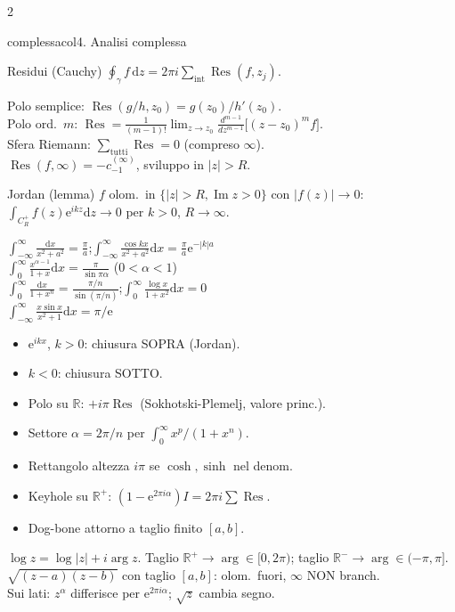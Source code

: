\documentclass[10pt,a4paper]{article}
\newcommand{\R}{\mathbb{R}}
\newcommand{\dd}{\mathrm{d}}
\newcommand{\eu}{\mathrm{e}}
\renewcommand{\Im}{\operatorname{Im}}
\DeclareMathOperator{\Res}{Res}
\begin{document}
\begin{multicols}{2}
\begin{secbox}{complessacol}{4. Analisi complessa}
\begin{teobox}{Residui (Cauchy)}
$\oint_\gamma f\,\dd z=2\pi i\sum_{\text{int}}\Res(f,z_j)$.
\end{teobox}

Polo semplice: $\Res(g/h,z_0)=g(z_0)/h'(z_0)$.\\
Polo ord.\ $m$: $\Res=\frac{1}{(m-1)!}\lim_{z\to z_0}\frac{d^{m-1}}{dz^{m-1}}\bigl[(z-z_0)^mf\bigr]$.\\
Sfera Riemann: $\sum_{\text{tutti}}\Res=0$ (compreso $\infty$).\\
$\Res(f,\infty)=-c_{-1}^{(\infty)}$, sviluppo in $|z|>R$.

\begin{teobox}{Jordan (lemma)}
$f$ olom.\ in $\{|z|>R,\Im z>0\}$ con $|f(z)|\to 0$: $\int_{C_R^+}f(z)\eu^{ikz}\dd z\to 0$ per $k>0$, $R\to\infty$.
\end{teobox}

$\int_{-\infty}^{\infty}\frac{\dd x}{x^2+a^2}=\frac{\pi}{a}$;\quad $\int_{-\infty}^{\infty}\frac{\cos kx}{x^2+a^2}\dd x=\frac{\pi}{a}\eu^{-|k|a}$\\
$\int_0^{\infty}\frac{x^{\alpha-1}}{1+x}\dd x=\frac{\pi}{\sin\pi\alpha}$ ($0\!<\!\alpha\!<\!1$)\\
$\int_0^{\infty}\frac{\dd x}{1+x^n}=\frac{\pi/n}{\sin(\pi/n)}$;\quad $\int_0^{\infty}\frac{\log x}{1+x^2}\dd x=0$\\
$\int_{-\infty}^{\infty}\frac{x\sin x}{x^2+1}\dd x=\pi/\eu$

\begin{itemize}
\item $\eu^{ikx}$, $k>0$: chiusura SOPRA (Jordan).
\item $k<0$: chiusura SOTTO.
\item Polo su $\R$: $+i\pi\Res$ (Sokhotski-Plemelj, valore princ.).
\item Settore $\alpha=2\pi/n$ per $\int_0^\infty x^p/(1+x^n)$.
\item Rettangolo altezza $i\pi$ se $\cosh,\sinh$ nel denom.
\item Keyhole su $\R^+$: $(1-\eu^{2\pi i\alpha})I=2\pi i\sum\Res$.
\item Dog-bone attorno a taglio finito $[a,b]$.
\end{itemize}

$\log z=\log|z|+i\arg z$. Taglio $\R^+\!\to\arg\in[0,2\pi)$; taglio $\R^-\!\to\arg\in(-\pi,\pi]$.\\
$\sqrt{(z-a)(z-b)}$ con taglio $[a,b]$: olom.\ fuori, $\infty$ NON branch.\\
Sui lati: $z^\alpha$ differisce per $\eu^{2\pi i\alpha}$; $\sqrt z$ cambia segno.


\end{secbox}
\end{multicols}
\end{document}
